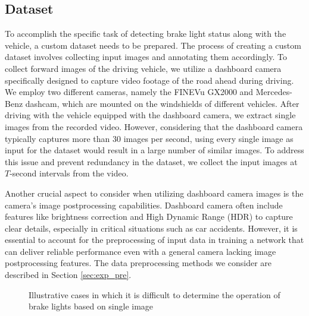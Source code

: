 \subsection{Dataset}
\label{sec:method_dataset}
To accomplish the specific task of detecting brake light status along with the vehicle, a custom dataset needs to be prepared.
The process of creating a custom dataset involves collecting input images and annotating them accordingly.
To collect forward images of the driving vehicle, we utilize a dashboard camera specifically designed to capture video footage of the road ahead during driving. 
We employ two different cameras, namely the FINEVu GX2000 and Mercedes-Benz dashcam, which are mounted on the windshields of different vehicles.
After driving with the vehicle equipped with the dashboard camera, we extract single images from the recorded video.
However, considering that the dashboard camera typically captures more than 30 images per second, using every single image as input for the dataset would result in a large number of similar images.
To address this issue and prevent redundancy in the dataset, we collect the input images at $T$-second intervals from the video.

Another crucial aspect to consider when utilizing dashboard camera images is the camera's image postprocessing capabilities.
Dashboard camera often include features like brightness correction and High Dynamic Range (HDR) to capture clear details, especially in critical situations such as car accidents.
However, it is essential to account for the preprocessing of input data in training a network that can deliver reliable performance even with a general camera lacking image postprocessing features. 
The data preprocessing methods we consider are described in Section \ref{sec:exp_pre}.

\begin{figure}[t]%

    \hfill

\caption{Illustrative cases in which it is difficult to determine the operation of brake lights based on single image} 
\label{fig:label_hard}%
\end{figure}

